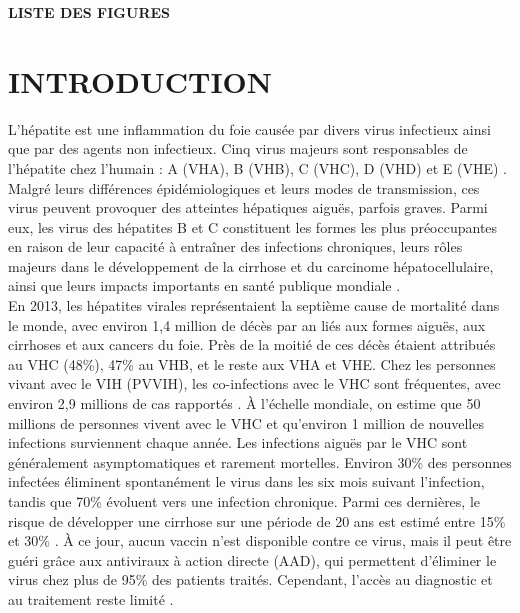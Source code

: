 \documentclass[a4paper,12pt]{article}
\begin{document}

\clearpage
{}
{}

\textbf{\huge LISTE DES FIGURES}
\vspace{1.5cm}

\listoffigures


\clearpage
{}
\setcounter{page}{1}
\section*{INTRODUCTION}

L’hépatite est une inflammation du foie causée par divers virus infectieux ainsi que par des agents non infectieux. Cinq virus majeurs sont responsables de l’hépatite chez l’humain : A (VHA), B (VHB), C (VHC), D (VHD) et E (VHE) \cite{Hepatitisa}. Malgré leurs différences épidémiologiques et leurs modes de transmission, ces virus peuvent provoquer des atteintes hépatiques aiguës, parfois graves. Parmi eux, les virus des hépatites B et C constituent les formes les plus préoccupantes en raison de leur capacité à entraîner des infections chroniques, leurs rôles majeurs dans le développement de la cirrhose et du carcinome hépatocellulaire, ainsi que leurs impacts importants en santé publique mondiale \cite{Hepatitisa}.\\

En 2013, les hépatites virales représentaient la septième cause de mortalité dans le monde, avec environ 1,4 million de décès par an liés aux formes aiguës, aux cirrhoses et aux cancers du foie. Près de la moitié de ces décès étaient attribués au VHC (48\%), 47\% au VHB, et le reste aux VHA et VHE. Chez les personnes vivant avec le VIH (PVVIH), les co-infections avec le VHC sont fréquentes, avec environ 2,9 millions de cas rapportés \cite{OrganisationMondialeSante,VIHSidaHepatite2025}. À l’échelle mondiale, on estime que 50 millions de personnes vivent avec le VHC et qu’environ 1 million de nouvelles infections surviennent chaque année. Les infections aiguës par le VHC sont généralement asymptomatiques et rarement mortelles. Environ 30\% des personnes infectées éliminent spontanément le virus dans les six mois suivant l’infection, tandis que 70\% évoluent vers une infection chronique. Parmi ces dernières, le risque de développer une cirrhose sur une période de 20 ans est estimé entre 15\% et 30\% \cite{Hepatitisb}. À ce jour, aucun vaccin n’est disponible contre ce virus, mais il peut être guéri grâce aux antiviraux à action directe (AAD), qui permettent d’éliminer le virus chez plus de 95\% des patients traités. Cependant, l’accès au diagnostic et au traitement reste limité \cite{Hepatitisa,Hepatitisb}. \\
 
\end{document}
